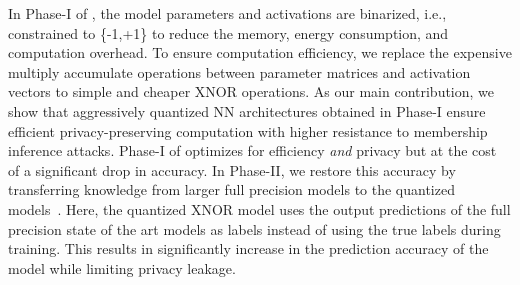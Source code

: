 
In Phase-I of \method, the model parameters and activations are binarized, i.e., constrained to \{-1,+1\} to reduce the memory, energy consumption, and computation overhead.
To ensure computation efficiency, we replace the expensive multiply accumulate operations between parameter matrices and activation vectors 
to simple and cheaper XNOR operations.
As our main contribution, we show that aggressively quantized NN architectures obtained in Phase-I ensure efficient privacy-preserving computation with higher resistance to membership inference attacks.%
Phase-I of \method\hspace{0.02in} optimizes for efficiency \textit{and} privacy but at the cost of a significant drop in accuracy.
In Phase-II, we restore this accuracy 
by transferring knowledge from larger full precision models to the quantized models~\cite{shejwalkar2019reconciling}.
Here, the quantized XNOR model uses the output predictions of the full precision state of the art models as labels instead of using the true labels during training.
This results in significantly increase in the prediction accuracy of the model while limiting privacy leakage.


